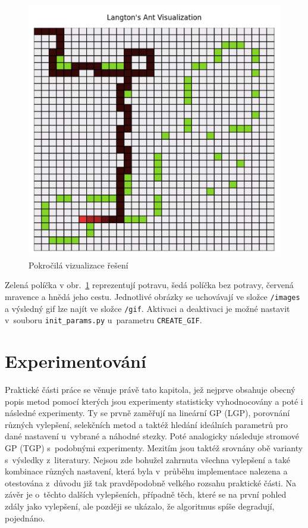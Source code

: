\begin{figure}[!h]
    \centering
    \includegraphics[scale=0.65]{obrazky-figures/ant-vis.png}
    \caption{Pokročilá vizualizace řešení}
    \label{fig:ant-vis}
\end{figure}


Zelená políčka v obr.~\ref{fig:ant-vis} reprezentují potravu, šedá políčka bez potravy, červená mravence a hnědá jeho cestu.
Jednotlivé obrázky se uchovávají ve složce \texttt{/images} a výsledný gif lze najít ve složce \texttt{/gif}. Aktivaci a deaktivaci je možné nastavit v~souboru \texttt{init\_params.py} u~parametru \texttt{CREATE\_GIF}.

\chapter{Experimentování}\label{ch:7}
Praktické části práce se věnuje právě tato kapitola, jež nejprve obsahuje obecný popis metod pomocí kterých jsou experimenty
statisticky vyhodnocovány a poté i následné experimenty. Ty se prvně zaměřují na
lineární GP (LGP), porovnání různých vylepšení, selekčních metod a taktéž hledání ideálních parametrů pro dané nastavení u~vybrané a náhodné stezky. Poté analogicky následuje stromové
GP (TGP) s~podobnými experimenty. Mezitím jsou taktéž srovnány obě varianty s~výsledky z~literatury. Nejsou zde bohužel zahrnuta všechna vylepšení a také kombinace různých nastavení,
která byla v~průběhu implementace nalezena a otestována z~důvodu již tak pravděpodobně
velkého rozsahu praktické části. Na závěr je o~těchto dalších vylepšeních, případně těch,
které se na první pohled zdály jako vylepšení, ale později se ukázalo, že algoritmus spíše
degradují, pojednáno.

